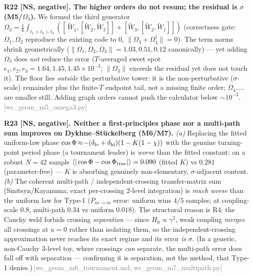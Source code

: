 \documentclass[aps,prd,reprint,nofootinbib]{revtex4-2}
\newcommand{\pnote}[1]{\textcolor{gray}{\footnotesize\,[#1]}}
\newcommand{\Pmid}{P_{m\to m}}   %
\begin{document}
\textbf{R22 [NS, negative]. The higher orders do not resum; the residual is $\sigma$ (M5/$\Omega_3$).} We
formed the third generator $\Omega_3=\tfrac16\!\int_{t_1>t_2>t_3}\!([\,\widetilde W_1,[\widetilde
W_2,\widetilde W_3]]+[\widetilde W_3,[\widetilde W_2,\widetilde W_1]])$ (correctness gate: $\Omega_1,\Omega_2$
reproduce the existing code to $0$, $\|\Omega_3+\Omega_3^\dagger\|=0$). The term norms shrink geometrically
($\|\Omega_1,\Omega_2,\Omega_3\|=1.03,0.51,0.12$ canonically) --- yet adding $\Omega_3$ does \emph{not}
reduce the error ($T$-averaged sweet spot $e_1,e_2,e_3=1.64,1.45,1.45\times10^{-3}$; $\|\Omega_3\|$ exceeds
the residual yet does not touch it). The floor lies \emph{outside} the perturbative tower: it is the
non-perturbative ($\sigma$-scale) remainder plus the finite-$T$ endpoint tail, not a missing finite order;
$\Omega_4,\dots$ are smaller still. Adding graph orders cannot push the calculator below
$\sim\!10^{-3}$.\pnote{ws\_geom\_m5\_omega3.py}

\textbf{R23 [NS, negative]. Neither a first-principles phase nor a multi-path sum improves on
Dykhne--St\"uckelberg (M6/M7).} \emph{(a)} Replacing the fitted uniform-law phase
$\cos\Phi\!\approx\!-(\delta_{\rm lo}+\delta_{\rm hi})(1-K(1-\chi))$ with the genuine turning-point period
phase (a tournament leader) is \emph{worse} than the fitted constant: on a robust $N{=}42$ sample
$\langle|\cos\Phi-\cos\Phi_{\rm true}|\rangle = 0.090$ (fitted $K$) vs $0.281$ (parameter-free) --- $K$ is
absorbing genuinely non-elementary, $\sigma$-adjacent content. \emph{(b)} The coherent multi-path /
independent-crossing transfer-matrix sum (Sinitsyn/Kayanuma; exact per-crossing $2$-level integration) is
\emph{much worse} than the uniform law for Type-1 ($\Pmid$ error: uniform wins $4/5$ samples; at
coupling-scale $0.8$, multi-path $0.34$ vs uniform $0.018$). The structural reason is R4: the Cauchy weld
forbids crossing \emph{separation} --- since $H_0\!\propto\!\gamma^2$, weak coupling \emph{merges} all
crossings at $u{=}0$ rather than isolating them, so the independent-crossing approximation never reaches its
exact regime and its error \emph{is} $\sigma$. (In a generic, non-Cauchy $3$-level toy, where crossings
\emph{can} separate, the multi-path error does fall off with separation --- confirming it is separation, not
the method, that Type-1 denies.)\pnote{ws\_geom\_m6\_tournament.md; ws\_geom\_m7\_multipath.py}
\end{document}
